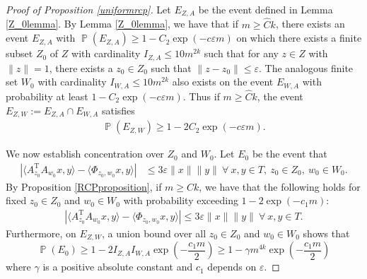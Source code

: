 \documentclass[11pt]{article}
\renewcommand{\epsilon}{\varepsilon}
\newcommand{\Pro}{\operatorname{\mathbb{P}}}
\renewcommand{\top}{{\mathrm{T}}}
\theoremstyle{remark}
\begin{document}
\begin{proof}[Proof of Proposition \ref{uniformrcp}]
Let $E_{Z,A}$ be the event defined in Lemma \ref{Z_0lemma}. By Lemma \ref{Z_0lemma}, we have that if $m \geqslant \hat{C} k$, there exists an event $E_{Z,A}$ with $\Pro(E_{Z,A}) \geqslant 1 - C_2 \exp(-c \epsilon m)$ on which there exists a finite subset $Z_0$ of $Z$ with cardinality $I_{Z,A} \leqslant 10m^{2k}$ such that for any $z \in Z$ with $\|z\|=1$, there exists a $z_0 \in Z_0$ such that $\|z-z_0\|\leqslant \epsilon$. The analogous finite set $W_0$ with cardinality $I_{W,A} \leqslant 10m^{2k}$ also exists on the event $E_{W,A}$ with probability at least $1 - C_2\exp(-c\epsilon m)$. Thus if $m \geqslant \hat{C} k$, the event $E_{Z,W} := E_{Z,A} \cap E_{W,A}$ satisfies \begin{align*}
    \Pro(E_{Z,W}) \geqslant 1 - 2 C_2 \exp(-c\epsilon m).
\end{align*} 

We now establish concentration over $Z_0$ and $W_0$. Let $E_0$ be the event that \begin{align*}
\left|\langle A_{z_0}^\top A_{w_0}  x,y \rangle - \langle \Phi_{z_0,w_0}x,y\rangle\right| & \leqslant 3\epsilon \|x\|\|y\|\ \forall\ x,y \in T,\ z_0 \in Z_0,\ w_0 \in W_0. 
\end{align*} By Proposition \ref{RCPproposition}, if $m \geqslant C k$, we have that the following holds for fixed $z_0 \in Z_0$ and $w_0 \in W_0$ with probability exceeding $1 - 2\exp(-c_1 m)$: \begin{align*}
    \left|\langle A_{z_0}^\top A_{w_0}x,y \rangle - \langle \Phi_{z_0,w_0}x,y\rangle\right| \leqslant 3\epsilon\|x\|\|y\|\ \forall\ x,y \in T.
\end{align*} Furthermore, on $E_{Z,W}$, a union bound over all $z_0 \in Z_0$ and $w_0 \in W_0$ shows that $$\Pro(E_0) \geqslant 1 - 2I_{Z,A}I_{W,A}\exp\left(-\frac{c_1 m}{2}\right) \geqslant 1 - \gamma m^{4k}\exp\left(-\frac{c_1m}{2}\right)$$ where $\gamma$ is a positive absolute constant and $c_1$ depends on $\epsilon$.


\end{proof}
\end{document}
